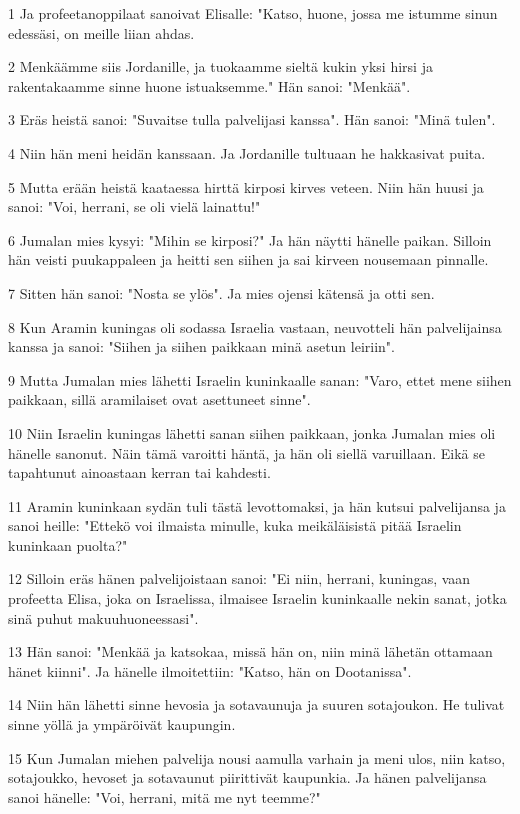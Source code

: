 \par 1 Ja profeetanoppilaat sanoivat Elisalle: "Katso, huone, jossa me istumme sinun edessäsi, on meille liian ahdas.
\par 2 Menkäämme siis Jordanille, ja tuokaamme sieltä kukin yksi hirsi ja rakentakaamme sinne huone istuaksemme." Hän sanoi: "Menkää".
\par 3 Eräs heistä sanoi: "Suvaitse tulla palvelijasi kanssa". Hän sanoi: "Minä tulen".
\par 4 Niin hän meni heidän kanssaan. Ja Jordanille tultuaan he hakkasivat puita.
\par 5 Mutta erään heistä kaataessa hirttä kirposi kirves veteen. Niin hän huusi ja sanoi: "Voi, herrani, se oli vielä lainattu!"
\par 6 Jumalan mies kysyi: "Mihin se kirposi?" Ja hän näytti hänelle paikan. Silloin hän veisti puukappaleen ja heitti sen siihen ja sai kirveen nousemaan pinnalle.
\par 7 Sitten hän sanoi: "Nosta se ylös". Ja mies ojensi kätensä ja otti sen.
\par 8 Kun Aramin kuningas oli sodassa Israelia vastaan, neuvotteli hän palvelijainsa kanssa ja sanoi: "Siihen ja siihen paikkaan minä asetun leiriin".
\par 9 Mutta Jumalan mies lähetti Israelin kuninkaalle sanan: "Varo, ettet mene siihen paikkaan, sillä aramilaiset ovat asettuneet sinne".
\par 10 Niin Israelin kuningas lähetti sanan siihen paikkaan, jonka Jumalan mies oli hänelle sanonut. Näin tämä varoitti häntä, ja hän oli siellä varuillaan. Eikä se tapahtunut ainoastaan kerran tai kahdesti.
\par 11 Aramin kuninkaan sydän tuli tästä levottomaksi, ja hän kutsui palvelijansa ja sanoi heille: "Ettekö voi ilmaista minulle, kuka meikäläisistä pitää Israelin kuninkaan puolta?"
\par 12 Silloin eräs hänen palvelijoistaan sanoi: "Ei niin, herrani, kuningas, vaan profeetta Elisa, joka on Israelissa, ilmaisee Israelin kuninkaalle nekin sanat, jotka sinä puhut makuuhuoneessasi".
\par 13 Hän sanoi: "Menkää ja katsokaa, missä hän on, niin minä lähetän ottamaan hänet kiinni". Ja hänelle ilmoitettiin: "Katso, hän on Dootanissa".
\par 14 Niin hän lähetti sinne hevosia ja sotavaunuja ja suuren sotajoukon. He tulivat sinne yöllä ja ympäröivät kaupungin.
\par 15 Kun Jumalan miehen palvelija nousi aamulla varhain ja meni ulos, niin katso, sotajoukko, hevoset ja sotavaunut piirittivät kaupunkia. Ja hänen palvelijansa sanoi hänelle: "Voi, herrani, mitä me nyt teemme?"

